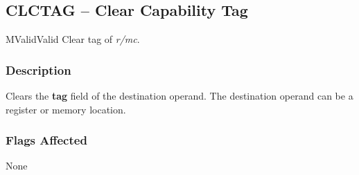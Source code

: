\clearpage
{}
{}
\subsection*{CLCTAG -- Clear Capability Tag}

\begin{x86opcodetable}
  {M}{Valid}{Valid}
  {Clear tag of \emph{r/mc}.}
\end{x86opcodetable}

\begin{x86opentable}
\end{x86opentable}

\subsubsection*{Description}

Clears the \textbf{tag} field of the destination operand.  The
destination operand can be a register or memory location.

\subsubsection*{Flags Affected}

None
